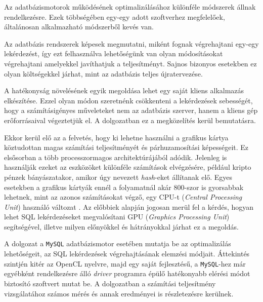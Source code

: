 
Az adatbázismotorok működésének optimalizálásához különféle módszerek állnak rendelkezésre. Ezek többségében egy-egy adott szoftverhez megfelelőek, általánosan alkalmazható módszerből kevés van.

Az adatbázis rendszerek képesek megmutatni, miként fognak végrehajtani egy-egy lekérdezést, így ezt felhasználva lehetőségünk van olyan módosításokat végrehajtani amelyekkel javíthatjuk a teljesítményt. Sajnos bizonyos esetekben ez olyan költségekkel járhat, mint az adatbázis teljes újratervezése.

A hatékonyság növelésének egyik megoldása lehet egy saját kliens alkalmazás elkészítése. Ezzel olyan módon szeretnénk csökkenteni a lekérdezések sebességét, hogy a számításigényes műveleteket nem az adatbázis szerver, hanem a kliens gép erőforrásaival végeztetjük el. A dolgozatban ez a megközelítés kerül bemutatásra.

Ekkor kerül elő az a felvetés, hogy ki lehetne használni a grafikus kártya köztudottan magas számítási teljesítményét és párhuzamosítási képességeit. Ez elsősorban a több processzormagos architektúrájából adódik. Jelenleg is használják ezeket az eszközöket különféle számítások elvégzésére, például kripto pénzek bányászatakor, amikor úgy nevezett \textit{hash}-eket állítanak elő. Egyes esetekben a grafikus kártyák ennél a folyamatnál akár 800-szor is gyorsabbak lehetnek, mint az azonos számításokat végző, egy CPU-t (\textit{Central Processing Unit}) használó változat \cite{crypto}. Az előbbiek alapján jogosan merül fel a kérdés, hogyan lehet SQL lekérdezéseket megvalósítani GPU (\textit{Graphics Processing Unit}) segítségével, illetve milyen előnyökkel és hátrányokkal járhat ez a megoldás.

A dolgozat a \texttt{MySQL} adatbázismotor esetében mutatja be az optimalizálás lehetőségeit, az SQL lekérdezések végrehajtásának elemzési módjait. Áttekintés szintjén kitér az OpenCL nyelvre, majd egy saját fejlesztésű, a \texttt{MySQL}-hez már egyébként rendelkezésre álló \textit{driver} programra épülő hatékonyabb elérési módot biztosító szoftvert mutat be. A dolgozatban a számítási teljesítmény vizsgálatához számos mérés és annak eredményei is részletezésre kerülnek.









